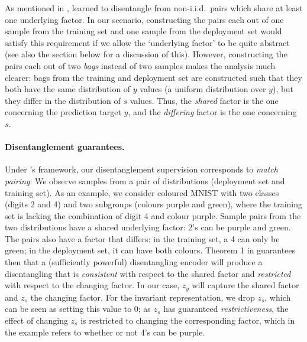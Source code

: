 As mentioned in ,
\citet{locatello2020weakly} learned to disentangle from non-i.i.d.\ pairs
which share at least one underlying factor.
In our scenario, constructing the pairs each out of one sample from the training set and one sample from the deployment set
would satisfy this requirement if we allow the `underlying factor' to be quite abstract
(see also the section below for a discussion of this).
However, constructing the pairs each out of two \emph{bags} instead of two samples
makes the analysis much clearer:
bags from the training and deployment set are constructed such
that they both have the same distribution of \(y\) values (a uniform distribution over \(y\)),
but they differ in the distribution of \(s\) values.
Thus, the \emph{shared} factor is the one concerning the prediction target \(y\),
and the \emph{differing} factor is the one concerning \(s\).

\paragraph{Disentanglement guarantees.}
%
%
%
Under \citet{ShuCheKumErmetal20}'s framework, our disentanglement supervision corresponds to \emph{match pairing}:
We observe samples from a pair of distributions (deployment set and training set).
As an example, we consider coloured MNIST with two classes (digits 2 and 4) and two subgroups (colours purple and green), where the training set is lacking the combination of digit 4 and colour purple.
Sample pairs from the two distributions have a shared underlying factor: 2's can be purple and green.
The pairs also have a factor that differs: in the training set, a 4 can only be green; in the deployment set, it can have both colours.
Theorem 1 in \citep{ShuCheKumErmetal20} guarantees then that a (sufficiently powerful) disentangling encoder will produce a disentangling that is \emph{consistent} with respect to the shared factor and \emph{restricted} with respect to the changing factor.
In our case, $z_y$ will capture the shared factor and $z_s$ the changing factor.
For the invariant representation, we drop $z_s$, which can be seen as setting this value to 0; as $z_s$ has guaranteed \emph{restrictiveness}, the effect of changing $z_s$ is restricted to changing the corresponding factor,
which in the example refers to whether or not 4's can be purple.
%
%
%

